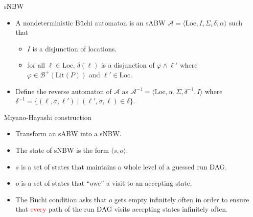 \documentclass[12pt]{beamer}
\begin{document}
\begin{frame}{sNBW}
	\begin{itemize}
		\item A nondeterministic Büchi automaton is an sABW $\mathcal{A} = \langle \text{Loc}, I, \Sigma, \delta, \alpha \rangle$ such that
		\begin{itemize}
			\item $I$ is a disjunction of locations.
			\item for all $\ell \in \text{Loc}$, $\delta(\ell)$ is a disjunction of $\varphi \land \ell'$ where $\varphi \in \mathcal{B}^{+}(\text{Lit}(P))$ and $ \ell' \in \text{Loc}$.
		\end{itemize}
		\item Define the reverse automaton of $\mathcal{A}$ as $\mathcal{A}^{-1} = \langle \text{Loc}, \alpha, \Sigma, \delta^{-1}, I \rangle$ where $\delta^{-1} = \{(\ell, \sigma, \ell') \mid (\ell', \sigma, \ell) \in \delta\}$.
	\end{itemize}
\end{frame}

\begin{frame}{Miyano-Hayashi construction}
	\begin{itemize}
		\item Transform an sABW into a sNBW.
		\item The state of sNBW is the form $\langle s, o \rangle$.
		\item $s$ is a set of states that maintains a whole level of a guessed run DAG.
		\item $o$ is a set of states that ``owe'' a visit to an accepting state.
		\item  The Büchi condition asks that $o$ gets empty infinitely often in order to ensure that \textcolor{red}{every} path of the run DAG visits accepting states infinitely often.
	\end{itemize}
\end{frame}
\end{document}
